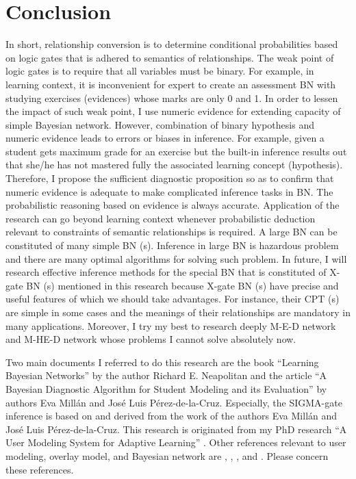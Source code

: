 \documentclass{article}
\numberwithin{equation}{section}
\numberwithin{figure}{section}
\numberwithin{table}{section}
\begin{document}
\section{Conclusion}
In short, relationship conversion is to determine conditional probabilities based on logic gates that is adhered to semantics of relationships. The weak point of logic gates is to require that all variables must be binary. For example, in learning context, it is inconvenient for expert to create an assessment BN with studying exercises (evidences) whose marks are only 0 and 1. In order to lessen the impact of such weak point, I use numeric evidence for extending capacity of simple Bayesian network. However, combination of binary hypothesis and numeric evidence leads to errors or biases in inference. For example, given a student gets maximum grade for an exercise but the built-in inference results out that she/he has not mastered fully the associated learning concept (hypothesis). Therefore, I propose the sufficient diagnostic proposition so as to confirm that numeric evidence is adequate to make complicated inference tasks in BN. The probabilistic reasoning based on evidence is always accurate. Application of the research can go beyond learning context whenever probabilistic deduction relevant to constraints of semantic relationships is required. A large BN can be constituted of many simple BN (s). Inference in large BN is hazardous problem and there are many optimal algorithms for solving such problem. In future, I will research effective inference methods for the special BN that is constituted of X-gate BN (s) mentioned in this research because X-gate BN (s) have precise and useful features of which we should take advantages. For instance, their CPT (s) are simple in some cases and the meanings of their relationships are mandatory in many applications. Moreover, I try my best to research deeply M-E-D network and M-HE-D network whose problems I cannot solve absolutely now.

Two main documents I referred to do this research are the book ``Learning Bayesian Networks'' \cite{neapolitan:bn} by the author Richard E. Neapolitan and the article ``A Bayesian Diagnostic Algorithm for Student Modeling and its Evaluation'' \cite{millan:bayesiandiagnostic} by authors Eva Millán and José Luis Pérez-de-la-Cruz. Especially, the SIGMA-gate inference is based on and derived from the work of the authors Eva Millán and José Luis Pérez-de-la-Cruz. This research is originated from my PhD research ``A User Modeling System for Adaptive Learning'' \cite{nguyen:zebra}. Other references relevant to user modeling, overlay model, and Bayesian network are \cite{froschl:usermodeling}, \cite{debra:aha}, \cite{murphy:bn}, and \cite{heckerman:bn}. Please concern these references.



\end{document}

